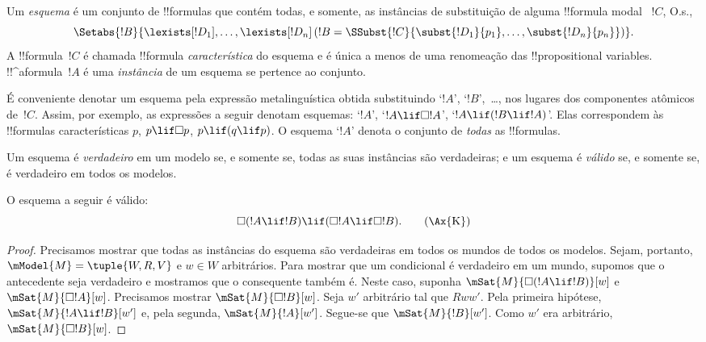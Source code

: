 \documentclass[../../../include/open-logic-section]{subfiles}
\begin{document}


\begin{defn}
  Um \emph{esquema} é um conjunto de !!{formula}s que contém todas,
  e somente, as instâncias de substituição de alguma !!{formula} modal
  ~$!C$, O.s.\@,
  \[
  \Setabs{!B}{\lexists[!D_1], \dots, \lexists[!D_n] \left(!B =
  \SSubst{!C}{\subst{!D_1}{p_1}, \dots, \subst{!D_n}{p_n}} \right) }.
  \]
  A !!{formula}~$!C$ é chamada !!{formula} \emph{característica} do
  esquema e é única a menos de uma renomeação das !!{propositional
  variable}s. !!^a{formula}~$!A$ é uma \emph{instância} de um esquema
  se pertence ao conjunto.
\end{defn}

É conveniente denotar um esquema pela expressão metalinguística obtida
substituindo `$!A$', `$!B$',~\dots, nos lugares dos componentes atômicos
de~$!C$.
Assim, por exemplo, as expressões a seguir denotam esquemas: `$!A$',
`$!A \lif \Box!A$', `$!A \lif (!B \lif !A)$'. Elas correspondem às
!!{formula}s características $p$, $p \lif \Box p$, $p \lif (q \lif p)$.
O esquema `$!A$' denota o conjunto de \emph{todas} as !!{formula}s.

\begin{defn}
  Um esquema é \emph{verdadeiro} em um modelo se, e somente se, todas
  as suas instâncias são verdadeiras; e um esquema é \emph{válido} se,
  e somente se, é verdadeiro em todos os modelos.
\end{defn}

\begin{prop}
  O esquema  a seguir é válido:
  \begin{equation*}
  \Box(!A \lif !B) \lif (\Box !A \lif \Box !B). \tag{\Ax{K}}
  \end{equation*}
\end{prop}

\begin{proof}
  Precisamos mostrar que todas as instâncias do esquema são verdadeiras
  em todos os mundos de todos os modelos. Sejam, portanto, $\mModel{M} =
  \tuple{W,R,V}$ e $w \in W$ arbitrários. Para mostrar que um condicional
  é verdadeiro em um mundo, supomos que o antecedente seja verdadeiro e
  mostramos que o consequente também é. Neste caso, suponha
  $\mSat{M}{\Box(!A \lif !B)}[w]$ e $\mSat{M}{\Box !A}[w]$. Precisamos
  mostrar $\mSat{M}{\Box !B}[w]$. Seja $w'$ arbitrário tal que $Rww'$.
  Pela primeira hipótese, $\mSat{M}{!A \lif !B}[w']$ e, pela segunda,
  $\mSat{M}{!A}[w']$. Segue-se que $\mSat{M}{!B}[w']$. Como $w'$ era
  arbitrário, $\mSat{M}{\Box !B}[w]$.
\end{proof}
\end{document}
